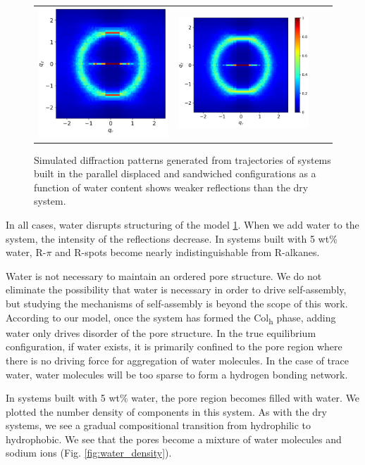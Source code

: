 \documentclass{article}
\begin{document}
\begin{figure}
\begin{tabular}{@{}c@{ }c@{ }c@{ }c@{}}
  	\includegraphics[width=.28\linewidth]{solvated_layered_rzplot_25.png}&
  	\includegraphics[width=.325\linewidth]{solvated_layered_rzplot_5.png}\\[-1ex]
  	\end{tabular}
  	\caption{Simulated diffraction patterns generated from trajectories of systems 
  	built in the parallel displaced and sandwiched configurations as a function
  	of water content shows weaker reflections than the dry system.}%
  \label{fig:solvation}

  \end{figure}
 
  In all cases, water disrupts structuring of the model \ref{fig:solvation}.
  When we add water to the system, the intensity of the reflections decrease. In
  systems built with 5 wt\% water, R-$\pi$ and R-spots become nearly
  indistinguishable from R-alkanes.

  Water is not necessary to maintain an ordered pore structure. We do not
  eliminate the possibility that water is necessary in order to drive
  self-assembly, but studying the mechanisms of self-assembly is beyond the
  scope of this work. According to our model, once the system has formed the
  Col\textsubscript{h} phase, adding water only drives disorder of the pore
  structure. In the true equilibrium configuration, if water exists, it is
  primarily confined to the pore region where there is no driving force for
  aggregation of water molecules. In the case of trace water, water molecules
  will be too sparse to form a hydrogen bonding network.

  In systems built with 5 wt\% water, the pore region becomes filled with
  water. We plotted the number density of components in this system. As with the 
  dry systems, we see a gradual compositional transition from hydrophilic to hydrophobic.  
  We see that the pores become a mixture of water molecules and sodium ions (Fig.
  \ref{fig:water_density}). 
  
\end{document}
